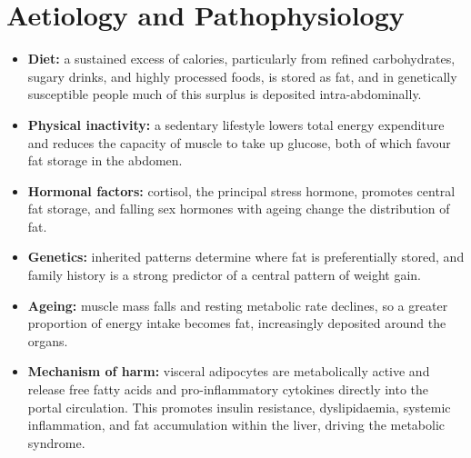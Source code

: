 \section*{Aetiology and Pathophysiology}
\begin{itemize}
    \item \textbf{Diet:} a sustained excess of calories, particularly from refined carbohydrates, sugary drinks, and highly processed foods, is stored as fat, and in genetically susceptible people much of this surplus is deposited intra-abdominally.
    \item \textbf{Physical inactivity:} a sedentary lifestyle lowers total energy expenditure and reduces the capacity of muscle to take up glucose, both of which favour fat storage in the abdomen.
    \item \textbf{Hormonal factors:} cortisol, the principal stress hormone, promotes central fat storage, and falling sex hormones with ageing change the distribution of fat.
    \item \textbf{Genetics:} inherited patterns determine where fat is preferentially stored, and family history is a strong predictor of a central pattern of weight gain.
    \item \textbf{Ageing:} muscle mass falls and resting metabolic rate declines, so a greater proportion of energy intake becomes fat, increasingly deposited around the organs.
    \item \textbf{Mechanism of harm:} visceral adipocytes are metabolically active and release free fatty acids and pro-inflammatory cytokines directly into the portal circulation. This promotes insulin resistance, dyslipidaemia, systemic inflammation, and fat accumulation within the liver, driving the metabolic syndrome.
\end{itemize}

